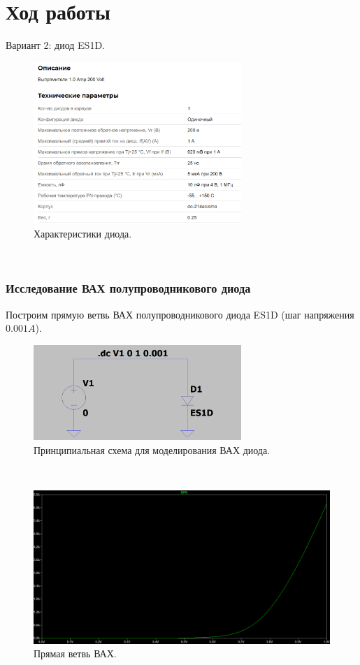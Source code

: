 \documentclass[12pt]{article}
\begin{document}
\section*{Ход работы}
Вариант 2: диод ES1D.
\begin{figure}[H]
    \centering
    \includegraphics[width=0.7\textwidth]{es1d_params.png}
    \caption{Характеристики диода.}
    \label{fig:es1d_params.png}
\end{figure}\\

\subsubsection*{Исследование ВАХ полупроводникового диода}
Построим прямую ветвь ВАХ полупроводникового диода ES1D (шаг напряжения $0.001 A$).
\begin{figure}[H]
    \centering
    \includegraphics[width=0.7\textwidth]{1_1_circuit_scheme.png}
    \caption{Принципиальная схема для моделирования ВАХ диода.}
    \label{fig:1_1_circuit_scheme.png}
\end{figure}\\

\begin{figure}[H]
    \centering
    \includegraphics[width=\textwidth]{1_1_vac.png}
    \caption{Прямая ветвь ВАХ.}
    \label{fig:1_1_vac.png}
\end{figure}\\
\end{document}
